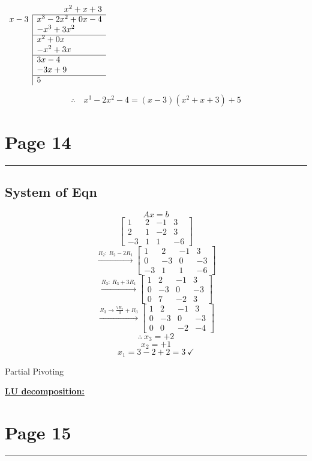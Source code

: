 \documentclass[11pt,a4paper]{article}
\newcommand{\pagehead}[1]{%
  \clearpage
  \section*{Page #1}
  \vspace{-0.6em}
  {\color{black!45}\rule{\linewidth}{0.5pt}}
  \vspace{0.4em}
}
\begin{document}
\vspace{0.4em}
\begin{center}
$\begin{array}{r|l}
\multicolumn{2}{r}{x^2+x+3}\\
\cline{2-2}
x-3 & x^3-2x^2+0x-4\\
 & -x^3+3x^2\\
\cline{2-2}
 & x^2+0x\\
 & -x^2+3x\\
\cline{2-2}
 & 3x-4\\
 & -3x+9\\
\cline{2-2}
 & 5
\end{array}$
\end{center}
\[
\therefore\quad x^3-2x^2-4=(x-3)(x^2+x+3)+5
\]

\pagehead{14}

\subsection*{System of Eqn}

\[
Ax=b
\]
\[
\left[\begin{array}{ccc|c}
1&2&-1&3\\
2&1&-2&3\\
-3&1&1&-6
\end{array}\right]
\]
\[
\xrightarrow{R_2:\ R_2-2R_1}
\left[\begin{array}{ccc|c}
1&2&-1&3\\
0&-3&0&-3\\
-3&1&1&-6
\end{array}\right]
\]
\[
\xrightarrow{R_3:\ R_3+3R_1}
\left[\begin{array}{ccc|c}
1&2&-1&3\\
0&-3&0&-3\\
0&7&-2&3
\end{array}\right]
\]
\[
\xrightarrow{R_3\to \frac{7R_2}{3}+R_3}
\left[\begin{array}{ccc|c}
1&2&-1&3\\
0&-3&0&-3\\
0&0&-2&-4
\end{array}\right]
\]
\[
\therefore\ x_3=+2
\]
\[
x_2=+1
\]
\[
x_1=3-2+2=3\ \checkmark
\]

Partial Pivoting

\textbf{\underline{LU decomposition:}}

\pagehead{15}
\end{document}
